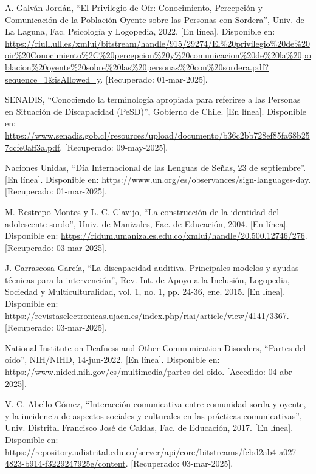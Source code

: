 \begin{thebibliography}{200}
    A. Galván Jordán, “El Privilegio de Oír: Conocimiento, Percepción y Comunicación de la Población Oyente sobre las Personas con Sordera”, Univ. de La Laguna, Fac. Psicología y Logopedia, 2022. [En línea]. Disponible en: \url{https://riull.ull.es/xmlui/bitstream/handle/915/29274/El%20privilegio%20de%20oir%20Conocimiento%2C%20percepcion%20y%20comunicacion%20de%20la%20poblacion%20oyente%20sobre%20las%20personas%20con%20sordera.pdf?sequence=1&isAllowed=y}. [Recuperado: 01-mar-2025].

    SENADIS, “Conociendo la terminología apropiada para referirse a las Personas en Situación de Discapacidad (PeSD)”, Gobierno de Chile. [En línea]. Disponible en: \url{https://www.senadis.gob.cl/resources/upload/documento/b36c2bb728ef85fa68b257ccfe0aff3a.pdf}. [Recuperado: 09-may-2025].

    Naciones Unidas, “Día Internacional de las Lenguas de Señas, 23 de septiembre”. [En línea]. Disponible en: \url{https://www.un.org/es/observances/sign-languages-day}. [Recuperado: 01-mar-2025].

    M. Restrepo Montes y L. C. Clavijo, “La construcción de la identidad del adolescente sordo”, Univ. de Manizales, Fac. de Educación, 2004. [En línea]. Disponible en: \url{https://ridum.umanizales.edu.co/xmlui/handle/20.500.12746/276}. [Recuperado: 03-mar-2025].

    J. Carrascosa García, “La discapacidad auditiva. Principales modelos y ayudas técnicas para la intervención”, Rev. Int. de Apoyo a la Inclusión, Logopedia, Sociedad y Multiculturalidad, vol. 1, no. 1, pp. 24-36, ene. 2015. [En línea]. Disponible en: \url{https://revistaselectronicas.ujaen.es/index.php/riai/article/view/4141/3367}. [Recuperado: 03-mar-2025].

    National Institute on Deafness and Other Communication Disorders, “Partes del oído”, NIH/NIHD, 14-jun-2022. [En línea]. Disponible en: \url{https://www.nidcd.nih.gov/es/multimedia/partes-del-oido}. [Accedido: 04-abr-2025]. 

    V. C. Abello Gómez, “Interacción comunicativa entre comunidad sorda y oyente, y la incidencia de aspectos sociales y culturales en las prácticas comunicativas”, Univ. Distrital Francisco José de Caldas, Fac. de Educación, 2017. [En línea]. Disponible en: \url{https://repository.udistrital.edu.co/server/api/core/bitstreams/fcbd2ab4-a027-4823-b914-f3229247925e/content}. [Recuperado: 03-mar-2025].


\end{thebibliography}
